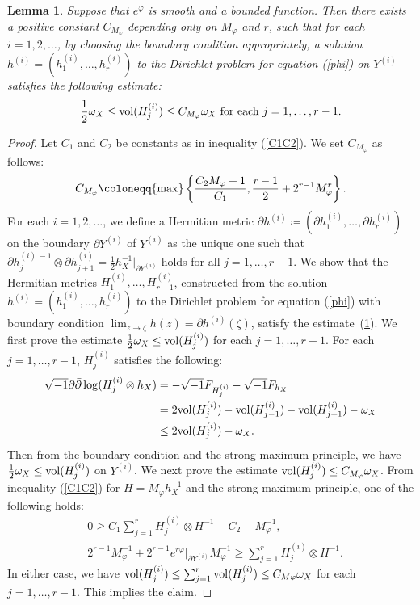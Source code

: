 \documentclass[12pt]{article}
\theoremstyle{definition}
\newtheorem{lemm}[defi]{Lemma}
\def\vol{{\rm vol}}
\def\max{{\rm max}}
\def\inum{{\sqrt{-1}}}
\begin{document}
\begin{lemm}\label{cmphi}{\it Suppose that $e^\varphi$ is smooth and a bounded function. Then there exists a positive constant $C_{M_\varphi} $ depending only on $M_\varphi$ and $r$, such that for each $i = 1, 2, \dots$, by choosing the boundary condition appropriately, a solution $h^{(i)} = (h_1^{(i)}, \dots, h_r^{(i)})$ to the Dirichlet problem for equation (\ref{phi}) on $Y^{(i)}$ satisfies the following estimate:
\begin{align}
\frac{1}{2}\omega_X \leq \vol(H_j^{(i)}) \leq C_{M_\varphi} \omega_X \ \text{for each $j = 1, \dots, r-1$}. \label{cmphi}
\end{align}
}
\end{lemm}
\begin{proof} 
Let $C_1$ and $C_2$ be constants as in inequality (\ref{C1C2}). We set $C_{M_\varphi}$ as follows:
\begin{align*}
C_{M_\varphi}\coloneqq \max\left\{\frac{C_2M_\varphi+1}{C_1}, \frac{r-1}{2}+2^{r-1}M_\varphi^r\right\}. 
\end{align*}
For each $i = 1, 2, \dots$, we define a Hermitian metric $\partial h^{(i)} \coloneqq (\partial h^{(i)}_1, \dots, \partial h^{(i)}_r)$ on the boundary $\partial Y^{(i)}$ of $Y^{(i)}$ as the unique one such that $\partial h_j^{(i)\,-1} \otimes \partial h_{j+1}^{(i)} =\frac{1}{2}h_X^{-1}\left.\right|_{\partial Y^{(i)}}$ holds for all $j = 1, \dots, r - 1$. We show that the Hermitian metrics \( H_1^{(i)}, \dots, H_{r-1}^{(i)} \), constructed from the solution \( h^{(i)} = (h_1^{(i)}, \dots, h_r^{(i)}) \) to the Dirichlet problem for equation (\ref{phi}) with boundary condition \( \lim_{z \to \zeta} h(z) = \partial h^{(i)}(\zeta) \), satisfy the estimate~(\ref{cmphi}). We first prove the estimate $\frac{1}{2}\omega_X \leq \vol(H_j^{(i)})$ for each $j=1,\dots, r-1$. For each $j=1,\dots, r-1$, $H_j^{(i)}$ satisfies the following:
\begin{align*}
\inum\partial\bar{\partial}\log(H_j^{(i)}\otimes h_X)&=-\inum F_{H_j^{(i)}}-\inum F_{h_X} \\
&=2\vol(H_j^{(i)})-\vol(H_{j-1}^{(i)})-\vol(H_{j+1}^{(i)})-\omega_X \\
&\leq 2\vol(H_j^{(i)})-\omega_X.
\end{align*}
Then from the boundary condition and the strong maximum principle, we have $\frac{1}{2}\omega_X \leq \vol(H_j^{(i)})$ on $Y^{(i)}$. We next prove the estimate $\vol(H_j^{(i)}) \leq C_{M_\varphi}\omega_X$. From inequality (\ref{C1C2}) for $H=M_\varphi h_X^{-1}$ and the strong maximum principle, one of the following holds:
\begin{align}
&0\geq C_1\sum_{j=1}^rH_j^{(i)}\otimes H^{-1}-C_2-M_\varphi^{-1}, \\
&2^{r-1}M_\varphi^{-1}+2^{r-1}e^{r\varphi}\left.\right|_{\partial Y^{(i)}}M_\varphi^{-1}\geq \sum_{j=1}^rH_j^{(i)}\otimes H^{-1}.
\end{align}
In either case, we have $\vol(H_j^{(i)})\leq \sum_{j=1}^r\vol(H_j^{(i)})\leq C_{M\varphi}\omega_X$ for each $j=1,\dots, r-1$. This implies the claim.
\end{proof}
\end{document}
